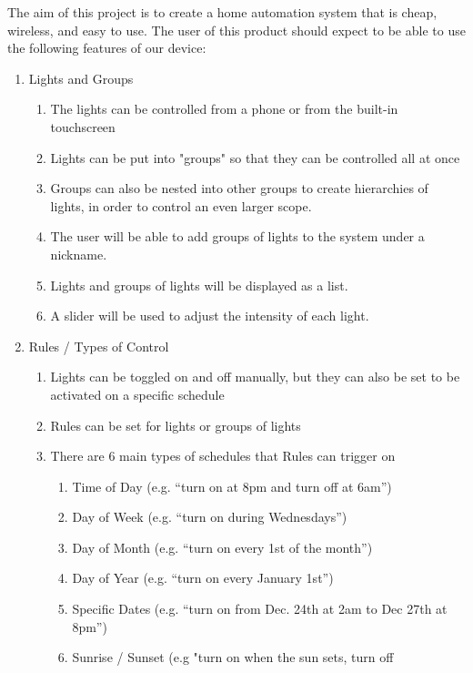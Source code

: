 \documentclass[oneside,openright]{book}
\begin{document}
The aim of this project is to create a home automation system that is cheap,
wireless, and easy to use. The user of this product should expect to be able to
use the following features of our device:

\begin{enumerate}
    \item Lights and Groups
    \begin{enumerate}
        \item The lights can be controlled from a phone or from the built-in
            touchscreen
        \item Lights can be put into "groups" so that they can be controlled
            all at once
        \item Groups can also be nested into other groups to create hierarchies
            of lights, in order to control an even larger scope.
        \item The user will be able to add groups of lights to the system under
            a nickname.
        \item Lights and groups of lights will be displayed as a list.
        \item A slider will be used to adjust the intensity of each light.
    \end{enumerate}
    \item Rules / Types of Control
    \begin{enumerate}
        \item Lights can be toggled on and off manually, but they can also be
            set to be activated on a specific schedule
        \item Rules can be set for lights or groups of lights
        \item There are 6 main types of schedules that Rules can trigger on
        \begin{enumerate}
            \item Time of Day (e.g. “turn on at 8pm and turn off at 6am”) 
            \item Day of Week  (e.g. “turn on during Wednesdays”)
            \item Day of Month  (e.g. “turn on every 1st of the month”)
            \item Day of Year  (e.g. “turn on every January 1st”)
            \item Specific Dates  (e.g. “turn on from Dec. 24th at 2am to Dec
                27th at 8pm”)
            \item Sunrise / Sunset (e.g "turn on when the sun sets, turn off

\end{enumerate}
\end{enumerate}
\end{enumerate}
\end{document}
